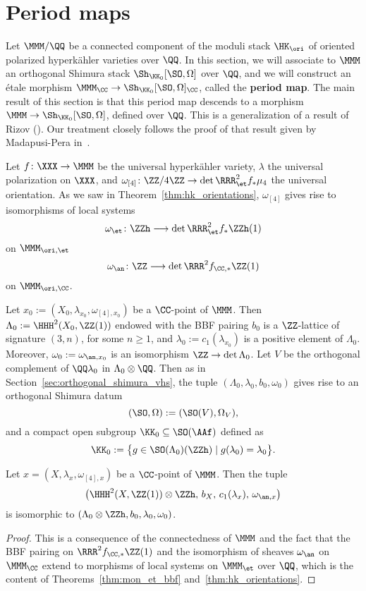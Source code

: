 \section{Period maps}\label{sec:period_maps}
Let $\MMM/\QQ$ be a connected component of the moduli stack $\HK_{\ori}$ of oriented polarized hyperk\"ahler varieties over $\QQ$. In this section, we will associate to $\MMM$ an orthogonal Shimura stack $\Sh_{\KK_0}[\SO,\Omega]$ over $\QQ$, and we will construct an \'etale morphism $\MMM_{\CC} \rightarrow \Sh_{\KK_0}[\SO,\Omega]_{\CC}$, called the {\bfseries period map}. The main result of this section is that this period map descends to a morphism $\MMM \rightarrow \Sh_{\KK_0}[\SO,\Omega]$, defined over $\QQ$. This is a generalization of a result of Rizov (\cite[Theorem~3.16]{RizovCM}). Our treatment closely follows the proof of that result given by Madapusi-Pera in~\cite{MadapusiPera}.

Let $f\colon \XXX \rightarrow \MMM$ be the universal hyperk\"ahler variety, $\lambda$ the universal polarization on $\XXX$, and $\omega_{[4]}\colon \ZZ/4\ZZ \rightarrow \det \RRR^2_{\et} f_* \mu_4$ the universal orientation. As we saw in Theorem~\ref{thm:hk_orientations}, $\omega_{[4]}$ gives rise to isomorphisms of local systems
$$
\omega_{\et}\colon \ZZh \longrightarrow \det \RRR^2_{\et} f_* \ZZh(1)
$$
on $\MMM_{\ori,\et}$
$$
\omega_{\an}\colon \ZZ \longrightarrow \det \RRR^2 f_{\CC,*} \ZZ(1)
$$
on $\MMM_{\ori,\CC}$.

Let $x_0 := (X_0,\lambda_{x_0},\omega_{[4],x_0})$ be a $\CC$-point of $\MMM$. Then $\Lambda_0 := \HHH^2(X_0,\ZZ(1))$ endowed with the BBF pairing $b_0$ is a $\ZZ$-lattice of signature $(3,n)$, for some $n \geq 1$, and $\lambda_0 := c_1(\lambda_{x_0})$ is a positive element of $\Lambda_0$. Moreover, $\omega_0 := \omega_{\an,x_0}$ is an isomorphism $\ZZ \rightarrow \det \Lambda_0$. Let $V$ be the orthogonal complement of $\QQ \lambda_0$ in $\Lambda_0 \otimes \QQ$. Then as in Section~\ref{sec:orthogonal_shimura_vhs}, the tuple $(\Lambda_0,\lambda_0,b_0,\omega_0)$ gives rise to an orthogonal Shimura datum
$$
(\SO,\Omega) := (\SO(V),\Omega_V),
$$
and a compact open subgroup $\KK_0 \subseteq \SO(\AAf)$ defined as
$$
\KK_0 := \big\{ g \in \SO(\Lambda_0)(\ZZh) \mid g(\lambda_0) = \lambda_0 \big\}.
$$
\begin{lemma}\label{lem:tuples_same_genus}
Let $x = (X,\lambda_{x},\omega_{[4],x})$ be a $\CC$-point of $\MMM$. Then the tuple 
$$
\left(\HHH^2(X,\ZZ(1)) \otimes \ZZh,\, b_X,\, c_1(\lambda_x),\, \omega_{\an,x}\right)
$$
is isomorphic to $(\Lambda_0 \otimes \ZZh, b_0, \lambda_0, \omega_0)$.
\end{lemma}
\begin{proof}
This is a consequence of the connectedness of $\MMM$ and the fact that the BBF pairing on $\RRR^2 f_{\CC,*} \ZZ(1)$ and the isomorphism of sheaves $\omega_{\an}$ on $\MMM_{\CC}$ extend to morphisms of local systems on $\MMM_{\et}$ over $\QQ$, which is the content of Theorems~\ref{thm:mon_et_bbf} and~\ref{thm:hk_orientations}.
\end{proof}

